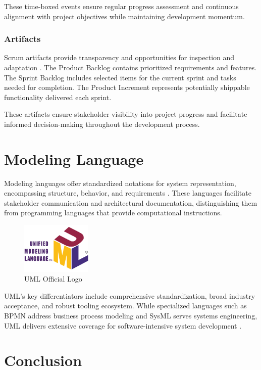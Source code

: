 These time-boxed events ensure regular progress assessment and continuous alignment with project objectives while maintaining development momentum.

\subsubsection{Artifacts}

Scrum artifacts provide transparency and opportunities for inspection and adaptation \cite{scrum_artifacts}. The Product Backlog contains prioritized requirements and features. The Sprint Backlog includes selected items for the current sprint and tasks needed for completion. The Product Increment represents potentially shippable functionality delivered each sprint.

These artifacts ensure stakeholder visibility into project progress and facilitate informed decision-making throughout the development process.

\section{Modeling Language}
Modeling languages offer standardized notations for system representation, encompassing structure, behavior, and requirements \cite{modeling_languages}. These languages facilitate stakeholder communication and architectural documentation, distinguishing them from programming languages that provide computational instructions.

\begin{figure}[htbp]
\centering
\includegraphics[width=0.3\textwidth]{pictures/web/UML_logo.svg.png}
\caption{UML Official Logo}
\label{fig:uml_logo}
\end{figure}

UML's key differentiators include comprehensive standardization, broad industry acceptance, and robust tooling ecosystem. While specialized languages such as BPMN address business process modeling and SysML serves systems engineering, UML delivers extensive coverage for software-intensive system development \cite{uml_comparison}.
\section{Conclusion}

